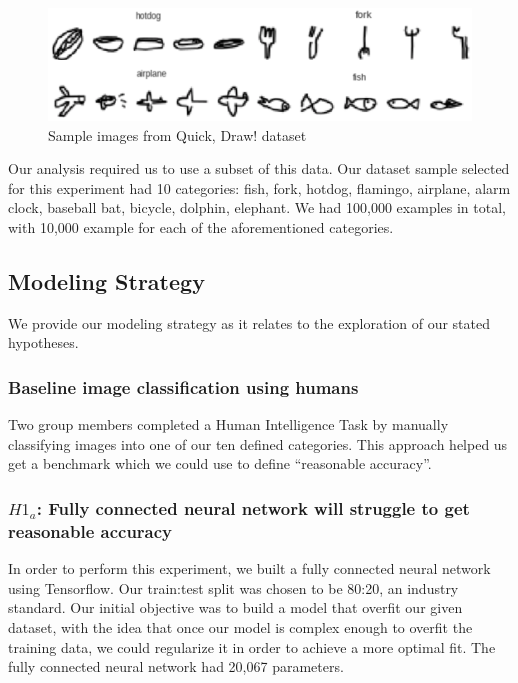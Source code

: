 \documentclass[11pt]{article}
\begin{document}
\begin{figure}[h]
  \begin{center}
    \includegraphics[scale=0.5]{fig1}
  \end{center}
  \caption{Sample images from Quick, Draw! dataset}
  \label{fig:quickImages}
\end{figure}

Our analysis required us to use a subset of this data. Our dataset sample
selected for this experiment had 10 categories: fish, fork, hotdog, flamingo,
airplane, alarm clock, baseball bat, bicycle, dolphin, elephant. We had
100,000 examples in total, with 10,000 example for each of the aforementioned
categories.


\subsection{Modeling Strategy}

We provide our modeling strategy as it relates to the exploration of
our stated hypotheses.

\subsubsection{Baseline image classification using humans}

Two group members completed a Human Intelligence Task by manually
classifying images into one of our ten defined categories. This
approach helped us get a benchmark which we could use to
define ``reasonable accuracy''. 

\subsubsection{$H1_a$: Fully connected neural network will struggle
  to get reasonable accuracy}

In order to perform this experiment, we built a fully connected neural network
using Tensorflow. Our train:test split was chosen to be 80:20, an industry
standard. Our initial objective was to build a model that overfit our given
dataset, with the idea that once our model is complex enough to overfit the
training data, we could regularize it in order to achieve a more optimal fit.
The fully connected neural network had 20,067 parameters.
\end{document}
